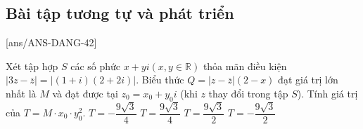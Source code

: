 \subsection{Bài tập tương tự và phát triển}	
[ans/ANS-DANG-42]
	\begin{ex}%
	Xét tập hợp $S$ các số phức $x+yi\left( x,y\in \mathbb{R} \right)$ thỏa mãn điều kiện $\left| 3z-\overline{z} \right|=\left| \left( 1+i \right)\left( 2+2i \right) \right|$. Biểu thức $Q=\left| z-\overline{z} \right|\left( 2-x \right)$ đạt giá trị lớn nhất là $M$ và đạt được tại $z_0=x_0+y_0i$ (khi $z$ thay đổi trong tập $S$). Tính giá trị của $T=M\cdot x_0\cdot y_0^2$.
	\choice
	{\True $T=-\dfrac{9\sqrt{3}}{4}$}
	{ $T=\dfrac{9\sqrt{3}}{4}$}
	{ $T=\dfrac{9\sqrt{3}}{2}$}
	{ $T=-\dfrac{9\sqrt{3}}{2}$}
\end{ex}
